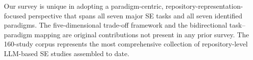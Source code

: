Our survey is unique in adopting a paradigm-centric, repository-representation-focused
perspective that spans all seven major SE tasks and all seven identified paradigms. The
five-dimensional trade-off framework and the bidirectional task--paradigm mapping are original
contributions not present in any prior survey. The 160-study corpus represents the most
comprehensive collection of repository-level LLM-based SE studies assembled to date.
